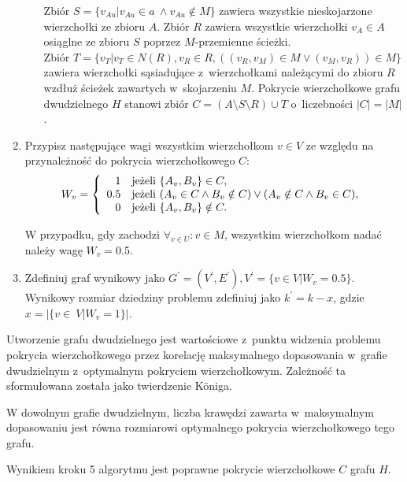 \begin{enumerate}
\begin{itemize}
        Zbiór $S = \{v_{Au}|v_{Au} \in a~\land v_{Au} \notin M\}$ zawiera wszystkie nieskojarzone wierzchołki ze zbioru $A$.
        Zbiór $R$ zawiera wszystkie wierzchołki $v_A \in A$ osiąglne ze zbioru $S$ poprzez $M$-przemienne ścieżki. \\
        Zbiór $T=\{v_T|v_T \in N(R), v_R \in R, ((v_R,v_M) \in M \lor (v_M,v_R)) \in M\}$ zawiera wierzchołki sąsiadujące z~wierzchołkami należącymi do zbioru $R$ wzdłuż ścieżek zawartych w~skojarzeniu $M$.
        Pokrycie wierzchołkowe grafu dwudzielnego $H$ stanowi zbiór $C=(A \setminus S \setminus R) \cup T$ o~liczebności $|C|=|M|$.
    \end{itemize}
  \item Przypisz następujące wagi wszystkim wierzchołkom $v \in V$ ze względu na przynależność do pokrycia wierzchołkowego $C$:
    \begin{equation*}
    W_v = \left\{
    \begin{array}{rl}
    1 & \textnormal{jeżeli } \{A_v, B_v\} \in C,\\
    0.5 & \textnormal{jeżeli } (A_v \in C \land B_v \notin C) \lor (A_v \notin C \land B_v \in C),\\
    0 & \textnormal{jeżeli } \{A_v, B_v\} \notin C.
    \end{array} \right.
    \end{equation*}

    W przypadku, gdy zachodzi $\forall_{v \in U}:{v \in M}$, wszystkim wierzchołkom nadać należy wagę $W_v=0.5$.
  \item Zdefiniuj graf wynikowy jako 
    $G^\prime=(V^\prime, E^\prime), V^\prime=\{v \in V|W_v=0.5\}$.
    Wynikowy rozmiar dziedziny problemu zdefiniuj jako 
    $k^\prime=k-x$, gdzie $x=|\{v\in~V|W_v=1\}|$.
\end{enumerate}
Utworzenie grafu dwudzielnego jest wartościowe z~punktu widzenia problemu
pokrycia wierzchołkowego przez korelację maksymalnego dopasowania w~grafie
dwudzielnym z~optymalnym pokryciem wierzchołkowym. 
Zależność ta sformułowana została jako twierdzenie K\"oniga.
\begin{theorem}
  W dowolnym grafie dwudzielnym, liczba krawędzi zawarta w~maksymalnym
  dopasowaniu jest równa rozmiarowi optymalnego pokrycia wierzchołkowego tego
  grafu.
\end{theorem}
\begin{theorem}\label{theorem_nf1}
  Wynikiem kroku 5 algorytmu jest poprawne pokrycie wierzchołkowe $C$ grafu $H$.
\end{theorem}
